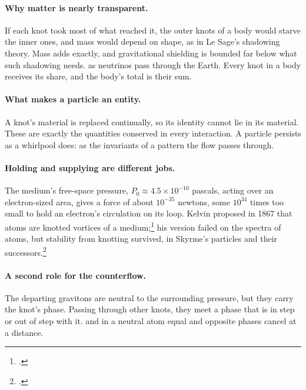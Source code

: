 \documentclass[11pt,a4paper]{article}
\newcommand{\fn}[1]{\footnote{\citealp{#1}.}}
\begin{document}
\paragraph{Why matter is nearly transparent.} If each knot took most of what reached it, the outer knots of a body would starve the inner ones, and mass would depend on shape, as in Le Sage's shadowing theory. Mass adds exactly, and gravitational shielding is bounded far below what such shadowing needs.  as neutrinos pass through the Earth. Every knot in a body receives its share, and the body's total is their sum.

\paragraph{What makes a particle an entity.} A knot's material is replaced continually, so its identity cannot lie in its material.  These are exactly the quantities conserved in every interaction. A particle persists as a whirlpool does: as the invariants of a pattern the flow passes through.

\paragraph{Holding and supplying are different jobs.} The medium's free-space pressure, $P_0 \approx 4.5\times10^{-10}$ pascals, acting over an electron-sized area, gives a force of about $10^{-35}$ newtons, some $10^{34}$ times too small to hold an electron's circulation on its loop.  Kelvin proposed in 1867 that atoms are knotted vortices of a medium;\fn{kelvin1867} his version failed on the spectra of atoms, but stability from knotting survived, in Skyrme's particles and their successors.\fn{skyrme1962}

\paragraph{A second role for the counterflow.} The departing gravitons are neutral to the surrounding pressure, but they carry the knot's phase. Passing through other knots, they meet a phase that is in step or out of step with it.  and in a neutral atom equal and opposite phases cancel at a distance.
\end{document}
